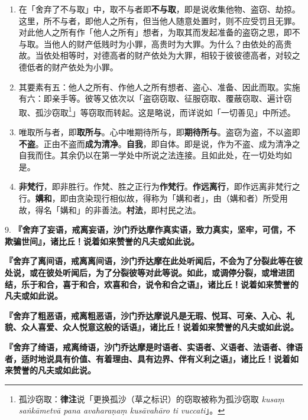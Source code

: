 \begin{enumerate}
\item 在「舍弃了不与取」中，取不与者即\textbf{不与取}，即是说收集他物、盗窃、劫掠。这里，所不与者，即他人之所有，但当他人随意处置时，则不应受罚且无罪。对此他人之所有作「他人之所有」想者，为取其而发起准备的盗窃之思，即不与取。当他人的财产低贱时为小罪，高贵时为大罪。为什么？由依处的高贵故。当依处相等时，对德高者的财产依处为大罪，相较于彼彼德高者，对较之德低者的财产依处为小罪。
\item 其要素有五：他人之所有、作他人之所有想者、盗心、准备、因此而取。实施有六：即亲手等。彼等又依次以「盗窃窃取、征服窃取、覆蔽窃取、遍计窃取、孤沙窃取\footnote{孤沙窃取：\textbf{律注}说「更换孤沙（草之标识）的窃取被称为孤沙窃取 \textit{kusaṃ saṅkāmetvā pana avaharaṇaṃ kusāvahāro ti vuccati}」。}」等窃取而转起。这是略说，而详说如「一切善见」中所述。
\item 唯取所与者，即\textbf{取所与}。心中唯期待所与，即\textbf{期待所与}。盗窃为盗，不以盗即\textbf{不盗}。正由不盗而\textbf{成为清净}。\textbf{自我}，即自体。即是说，作为不盗、成为清净之自我而住。其余仍以在第一学处中所说之法连接。且如此处，在一切处均如是。
\item \textbf{非梵行}，即非胜行。作梵、胜之正行为\textbf{作梵行}。\textbf{作远离行}，即作远离非梵行之行。\textbf{媾和}，即由贪染现行相似故，得称为「媾和者」，由（媾和者）所受用故，得名「媾和」的非善法。\textbf{村法}，即村民之法。\end{enumerate}

{\Large 9.} \textbf{『舍弃了妄语，戒离妄语，沙门乔达摩作真实语，致力真实，坚牢，可信，不欺骗世间』，诸比丘！说着如来赞誉的凡夫或如此说。}

\textbf{『舍弃了离间语，戒离离间语，沙门乔达摩在此处听闻后，不会为了分裂此等在彼处说，或在彼处听闻后，为了分裂彼等对此等说。如此，或调停分裂，或增进团结，乐于和合，喜于和合，欢喜和合，说令和合之语』，诸比丘！说着如来赞誉的凡夫或如此说。}

\textbf{『舍弃了粗恶语，戒离粗恶语，沙门乔达摩说凡是无瑕、悦耳、可亲、入心、礼貌、众人喜爱、众人悦意这般的话语』，诸比丘！说着如来赞誉的凡夫或如此说。}

\textbf{『舍弃了绮语，戒离绮语，沙门乔达摩是时语者、实语者、义语者、法语者、律语者，适时地说具有价值、有着理由、具有边界、伴有义利之语』，诸比丘！说着如来赞誉的凡夫或如此说。}

